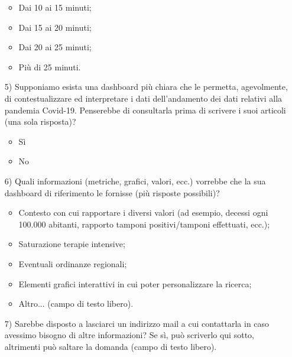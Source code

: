 \begin{itemize}
\begin{itemize}
        \item Dai 10 ai 15 minuti;
        \item Dai 15 ai 20 minuti;
        \item Dai 20 ai 25 minuti;
        \item Più di 25 minuti.
    \end{itemize} 
    \item[5)] Supponiamo esista una dashboard più chiara che le permetta, agevolmente, di contestualizzare ed interpretare i dati dell'andamento dei dati relativi alla pandemia Covid-19. Penserebbe di consultarla prima di scrivere i suoi articoli (una sola risposta)?
    \begin{itemize}
        \item Sì
        \item No
    \end{itemize}
    \item[6)] Quali informazioni (metriche, grafici, valori, ecc.) vorrebbe che la sua dashboard di riferimento le fornisse (più risposte possibili)?
    \begin{itemize}
        \item Contesto con cui rapportare i diversi valori (ad esempio, decessi ogni 100.000 abitanti, rapporto tamponi positivi/tamponi effettuati, ecc.);
        \item Saturazione terapie intensive;
        \item Eventuali ordinanze regionali;
        \item Elementi grafici interattivi in cui poter personalizzare la ricerca;
        \item Altro... (campo di testo libero).
    \end{itemize} 
    \item[7)] Sarebbe disposto a lasciarci un indirizzo mail a cui contattarla in caso avessimo bisogno di altre informazioni? Se sì, può scriverlo qui sotto, altrimenti può saltare la domanda (campo di testo libero).
\end{itemize}

